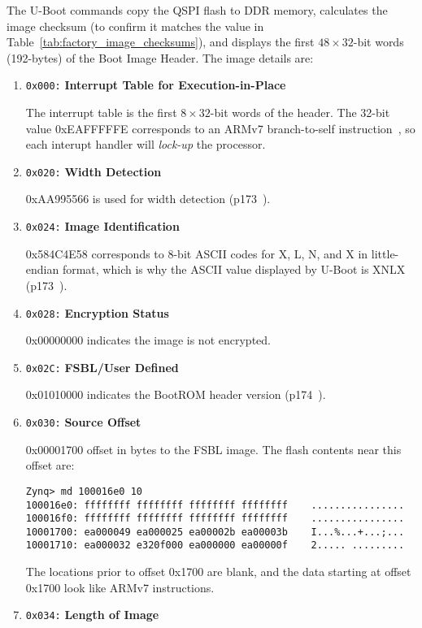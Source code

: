 %
The U-Boot commands copy the QSPI flash to DDR memory, calculates the
image checksum (to confirm it matches the value in
Table~\ref{tab:factory_image_checksums}),
and displays the first $48\times32$-bit words (192-bytes) of the
Boot Image Header. The image details are:
%
\begin{enumerate}
\item \texttt{0x000:} \textbf{Interrupt Table for Execution-in-Place}

The interrupt table is the first $8\times32$-bit words of the header.
The 32-bit value 0xEAFFFFFE corresponds to an ARMv7 branch-to-self
instruction~\cite{ARM_ARMv7_2018}, so each interupt handler will
\emph{lock-up} the processor.

\item \texttt{0x020:} \textbf{Width Detection}

0xAA995566 is used for width detection (p173~\cite{Xilinx_UG585_2021}).

\item \texttt{0x024:} \textbf{Image Identification}

0x584C4E58 corresponds to 8-bit ASCII codes for
X, L, N, and X in little-endian format, which is why the ASCII
value displayed by U-Boot is XNLX  (p173~\cite{Xilinx_UG585_2021}).

\item \texttt{0x028:} \textbf{Encryption Status}

0x00000000 indicates the image is not encrypted.

\item \texttt{0x02C:} \textbf{FSBL/User Defined}

0x01010000 indicates the BootROM header version (p174~\cite{Xilinx_UG585_2021}).

\item \texttt{0x030:} \textbf{Source Offset}

0x00001700 offset in bytes to the FSBL image. The flash contents
near this offset are:
%
\begin{verbatim}
Zynq> md 100016e0 10
100016e0: ffffffff ffffffff ffffffff ffffffff    ................
100016f0: ffffffff ffffffff ffffffff ffffffff    ................
10001700: ea000049 ea000025 ea00002b ea00003b    I...%...+...;...
10001710: ea000032 e320f000 ea000000 ea00000f    2..... .........
\end{verbatim}
%
The locations prior to offset 0x1700 are blank, and the data starting
at offset 0x1700 look like ARMv7 instructions.

\item \texttt{0x034:} \textbf{Length of Image}


\end{enumerate}
